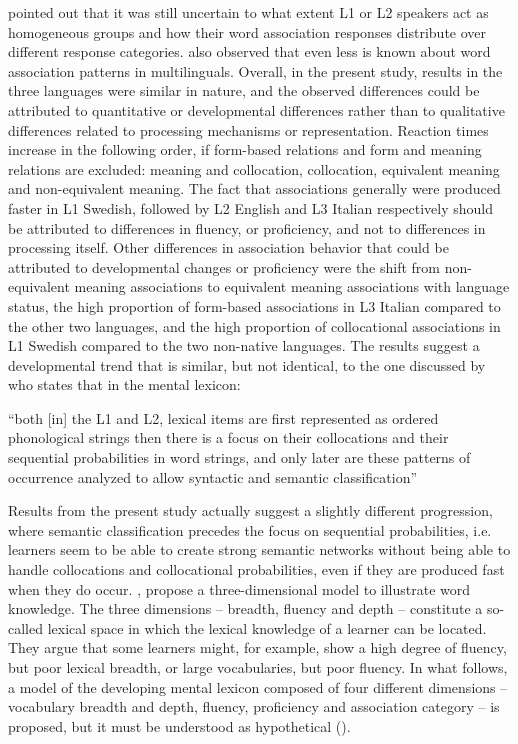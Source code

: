 \documentclass[output=paper,colorlinks,citecolor=brown,nonflat]{langsci/langscibook}
\begin{document}
\citet{CremerEtAl2010} pointed out that it was still uncertain to what extent L1 or L2 speakers act as homogeneous groups and how their word association responses distribute over different response categories. \citeauthor{CremerEtAl2010} also observed that even less is known about word association patterns in multilinguals. Overall, in the present study, results in the three languages were similar in nature, and the observed differences could be attributed to quantitative or developmental differences rather than to qualitative differences related to processing mechanisms or representation. Reaction times increase in the following order, if form-based relations and form and meaning relations are excluded: meaning and collocation, collocation, equivalent meaning and non-equivalent meaning. The fact that associations generally were produced faster in L1 Swedish, followed by L2 English and L3 Italian respectively should be attributed to differences in fluency, or proficiency, and not to differences in processing itself. Other differences in association behavior that could be attributed to developmental changes or proficiency were the shift from non-equivalent meaning associations to equivalent meaning associations with language status, the high proportion of form-based associations in L3 Italian compared to the other two languages, and the high proportion of collocational associations in L1 Swedish compared to the two non-native languages. The results suggest a developmental trend that is similar, but not identical, to the one discussed by \citet[94]{EllisN1996} who states that in the mental lexicon:

“both [in] the L1 and L2, lexical items are first represented as ordered phonological strings then there is a focus on their collocations and their sequential probabilities in word strings, and only later are these patterns of occurrence analyzed to allow syntactic and semantic classification”

Results from the present study actually suggest a slightly different progression, where semantic classification precedes the focus on sequential probabilities, i.e. learners seem to be able to create strong semantic networks without being able to handle collocations and collocational probabilities, even if they are produced fast when they do occur. \citet{DallerEtAl2007}, propose a three-dimensional model to illustrate word knowledge. The three dimensions – breadth, fluency and depth – constitute a so-called lexical space in which the lexical knowledge of a learner can be located. They argue that some learners might, for example, show a high degree of fluency, but poor lexical breadth, or large vocabularies, but poor fluency. In what follows, a model of the developing mental lexicon composed of four different dimensions – vocabulary breadth and depth, fluency, proficiency and association category – is proposed, but it must be understood as hypothetical ().
\end{document}
